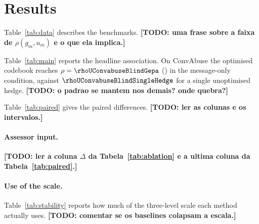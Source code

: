 \section{Results}

Table~\ref{tab:data} describes the benchmarks. \textbf{[TODO: uma frase sobre a faixa de $\rho(g_m,u_m)$ e o que ela implica.]}



Table~\ref{tab:main} reports the headline association. On ConvAbuse the optimised codebook reaches $\rho = \rhoUConvabuseBlindGepa$ (\ciUConvabuseBlindGepa) in the message-only condition, against $\rhoUConvabuseBlindSingleHedge$ for a single unoptimised hedge. \textbf{[TODO: o padrao se mantem nos demais? onde quebra?]}



Table~\ref{tab:paired} gives the paired differences. \textbf{[TODO: ler as colunas e os intervalos.]}



\paragraph{Assessor input.} \textbf{[TODO: ler a coluna $\Delta$ da Tabela~\ref{tab:ablation} e a ultima coluna da Tabela~\ref{tab:paired}.]}



\paragraph{Use of the scale.} Table~\ref{tab:stability} reports how much of the three-level scale each method actually uses. \textbf{[TODO: comentar se os baselines colapsam a escala.]}

